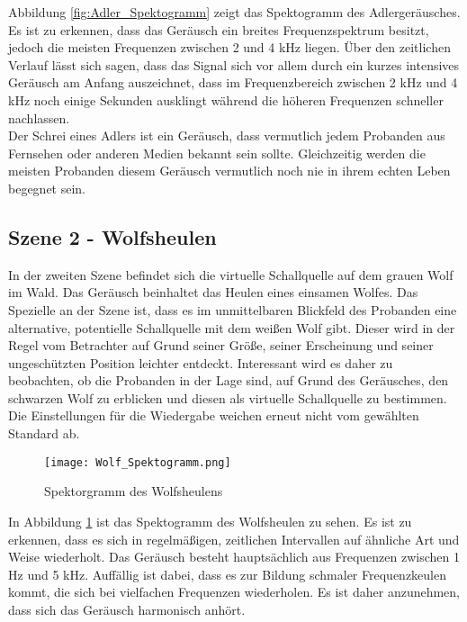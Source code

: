 Abbildung \ref{fig:Adler_Spektogramm} zeigt das Spektogramm des Adlergeräusches. Es ist zu erkennen, dass das Geräusch ein breites Frequenzspektrum besitzt, jedoch die meisten Frequenzen zwischen 2 und 4 kHz liegen. Über den zeitlichen Verlauf lässt sich sagen, dass das Signal sich vor allem durch ein kurzes intensives Geräusch am Anfang auszeichnet, dass im Frequenzbereich zwischen 2 kHz und 4 kHz noch einige Sekunden ausklingt während die höheren Frequenzen schneller nachlassen.\\

 Der Schrei eines Adlers ist ein Geräusch, dass vermutlich jedem Probanden aus Fernsehen oder anderen Medien bekannt sein sollte. Gleichzeitig werden die meisten Probanden diesem Geräusch vermutlich noch nie in ihrem echten Leben begegnet sein.

\subsection{Szene 2 - Wolfsheulen}

In der zweiten Szene befindet sich die virtuelle Schallquelle auf dem grauen Wolf im Wald. Das Geräusch beinhaltet das Heulen eines einsamen Wolfes. Das Spezielle an der Szene ist, dass es im unmittelbaren Blickfeld des Probanden eine alternative, potentielle Schallquelle mit dem weißen Wolf gibt. Dieser wird in der Regel vom Betrachter auf Grund seiner Größe, seiner Erscheinung und seiner ungeschützten Position leichter entdeckt. Interessant wird es daher zu beobachten, ob die Probanden in der Lage sind, auf Grund des Geräusches,  den schwarzen Wolf zu erblicken und diesen als virtuelle Schallquelle zu bestimmen.  Die Einstellungen für die Wiedergabe weichen erneut nicht vom gewählten Standard ab. 

 \begin{figure}[H]
\centering
\texttt{[image: Wolf\_Spektogramm.png]}
\caption{Spektorgramm des Wolfsheulens}
\label{fig:Wolf_Spektogramm}
\end{figure} 

In Abbildung \ref{fig:Wolf_Spektogramm} ist das Spektogramm des Wolfsheulen zu sehen. Es ist zu erkennen, dass es sich in regelmäßigen, zeitlichen Intervallen auf ähnliche Art und Weise wiederholt. Das Geräusch besteht hauptsächlich aus Frequenzen zwischen 1 Hz und 5 kHz. Auffällig ist dabei, dass es zur Bildung schmaler Frequenzkeulen kommt, die sich bei vielfachen Frequenzen wiederholen. Es ist daher anzunehmen, dass sich das Geräusch harmonisch anhört. \\

